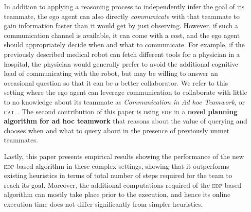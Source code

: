 \documentclass[letterpaper]{article}
\begin{document}
In addition to applying a reasoning process to independently infer the goal of its teammate, the ego agent can also directly \textit{communicate} with that teammate to gain information faster than it would get by just observing. However, if such a communication channel is available, it can come with a cost, and the ego agent should appropriately decide when and what to communicate. %
For example, if the previously described medical robot can fetch different tools for a physician in a hospital, the physician would generally prefer to avoid the additional cognitive load of communicating with the robot, but may be willing to answer an occasional question so that it can be a better collaborator. We refer to this setting where the ego agent can leverage communication to collaborate with little to no knowledge about its teammate as \emph{Communication in Ad hoc Teamwork}, or \textsc{cat}~\cite{mirskypenny}.
The second contribution of this paper is using \textsc{edp} in a
\textbf{novel planning algorithm for ad hoc teamwork} that reasons about the value of querying and chooses when and what to query about in the presence of previously unmet teammates.

Lastly, this paper presents empirical results showing the performance of the new \textsc{edp}-based algorithm in these complex settings, showing that it outperforms existing heuristics in terms of total number of steps required for the team to reach its goal. Moreover, the additional computations required of the \textsc{edp}-based algorithm can mostly take place prior to the execution, and hence its online execution time does not differ significantly from simpler heuristics.
\end{document}
